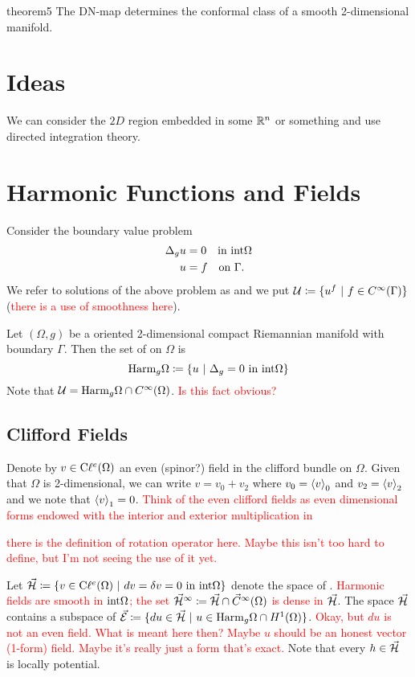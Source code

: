 \begin{thm}{}{theorem5}
	The DN-map determines the conformal class of  a smooth 2-dimensional manifold.
\end{thm}

\section{Ideas}
We can consider the $2D$ region embedded in some $\mathbb{R}^n$ or something and use directed integration theory.

\section{Harmonic Functions and Fields}
Consider the boundary value problem
\begin{align}
	\Delta_g u &= 0 \quad \textrm{in $\mathrm{int} \Omega$}\\
	u&=f \quad \textrm{on $\Gamma$}.
\end{align}
We refer to solutions of the above problem as  and we put $\mathcal{U} \coloneqq \{u^f~\vert~f\in C^\infty(\Gamma)\}$ (\textcolor{red}{there is a use of smoothness here}).

Let $(\Omega,g)$ be a oriented 2-dimensional compact Riemannian manifold with boundary $\Gamma$. Then the set of  on $\Omega$ is
  \[
  \mathrm{Harm}_g \Omega \coloneqq \{u~\vert~\Delta_g=0 ~\textrm{in}~\mathrm{int} \Omega\}
  \]
  Note that $\mathcal{U} = \mathrm{Harm}_g \Omega \cap C^\infty (\Omega)$. \textcolor{red}{Is this fact obvious?}
    
  \subsection{Clifford Fields}
  Denote by $v\in \mathrm{C}\ell^e(\Omega)$ an even (spinor?) field in the clifford bundle on $\Omega$.  Given that $\Omega$ is 2-dimensional, we can write $v=v_0+v_2$ where $v_0=\left\langle v\right\rangle_0$ and $v_2=\left\langle v\right\rangle_2$ and we note that $\left\langle v\right\rangle_1=0$. \textcolor{red}{Think of the even clifford fields as even dimensional forms endowed with the interior and exterior multiplication in \cite{dirac-spectral}}
    
  \textcolor{red}{there is the definition of rotation operator here. Maybe this isn't too hard to define, but I'm not seeing the use of it yet.}
  
  Let $\vec{\mathcal{H}}\coloneqq \{v \in \mathrm{C}\ell^e(\Omega) ~\vert~ dv=\delta v = 0 ~\textrm{in $\mathrm{int} \Omega$}\}$ denote the space of .  \textcolor{red}{Harmonic fields are smooth in $\mathrm{int} \Omega$; the set $\vec{\mathcal{H}}^\infty \coloneqq \vec{\mathcal{H}} \cap \vec{C}^\infty(\Omega)$ is dense in $\vec{\mathcal{H}}$}. The space $\vec{\mathcal{H}}$ contains a subspace of  $\vec{\mathcal{E}} \coloneqq \{d u \in \vec{\mathcal{H}} ~\vert~ u \in \mathrm{Harm}_g\Omega \cap H^1(\Omega)\}$.  \textcolor{red}{Okay, but $d u$ is not an even field.  What is meant here then? Maybe $u$ should be an honest vector (1-form) field. Maybe it's really just a form that's exact.} Note that every $h\in \vec{\mathcal{H}}$ is locally potential.
  
